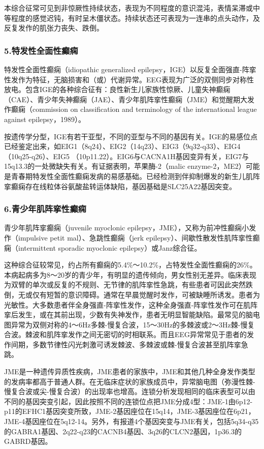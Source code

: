 本综合征常可见到非惊厥性持续状态，表现为不同程度的意识混沌，表情呆滞或中等程度的感觉迟钝，有时呈木僵状态。持续状态还可表现为一连串的点头动作，及反复发作的肌张力丧失、跌倒。

\subsubsection{5.特发性全面性癫痫}

特发性全面性癫痫（idiopathic generalized
epilepsy，IGE）以反复全面强直-阵挛性发作为特征，无脑损害和（或）代谢异常。EEG表现为广泛的双侧同步对称性放电。包含IGE的各种综合征有：良性新生儿家族性惊厥、儿童失神癫痫（CAE）、青少年失神癫痫（JAE）、青少年肌阵挛性癫痫（JME）和觉醒期大发作癫痫（commission
on classification and terminology of the international league against
epilepsy，1989）。

按遗传学分型，IGE有若干亚型，不同的亚型与不同的基因有关。IGE的易感位点已经鉴定出来，如EIG1（8q24）、EIG2（14q23）、EIG3（9q32-q33）、EIG4（10q25-q26）、EIG5
（10p11.22）。EIG6与CACNA1H基因变异有关，EIG7与15q13.3的一处微缺失有关。有证据表明，苹果酶-2（malic
enzyme-2，ME2）可能是青春期特发性全面性癫痫发病的易感基础。已经检测到伴抑制爆发的新生儿肌阵挛癫痫存在线粒体谷氨酸盐转运体缺陷，基因基础是SLC25A22基因突变。

\subsubsection{6.青少年肌阵挛性癫痫}

青少年肌阵挛癫痫（juvenile myoclonic
epilepsy，JME），又称为前冲性癫痫小发作（impulsive petit
mal）、急跳性癫痫（jerk
epilepsy）、间歇性散发性肌阵挛性癫痫（intermittent sporadic myoclonic
epilepsy）或Janz综合征。

这种综合征较常见，约占所有癫痫的5.4\%～10.2\%，占特发性全面性癫痫的26\%。本病起病多为8～20岁的青少年，有明显的遗传倾向，男女性别无差异。临床表现为双臂的单次或反复的不规则、无节律的肌阵挛性急跳，有些患者可因此突然跌倒，无或仅有短暂的意识障碍。通常在早晨觉醒时发作，可被缺睡所诱发。患者为光敏性。大多数患者伴全身强直-阵挛性发作，这种全身强直-阵挛性发作可在肌阵挛后发生，或在其前出现，少数有失神发作，患者无明显智能缺陷。最常见的脑电图异常为双侧对称的4～6Hz多棘-慢复合波，15～30Hz的多棘波或2～3Hz棘-慢复合波。棘波和肌阵挛发作之间无密切的时相联系。而且EEG异常常见于患者的发作间期，多数节律性闪光刺激可诱发棘波、多棘波或棘-慢复合波甚至肌阵挛急跳。

JME是一种遗传异质性疾病，JME患者的家族中，JME和其他几种全身发作类型的发病率都高于普通人群。在无临床症状的家族成员中，异常脑电图（弥漫性棘-慢复合波或尖-慢复合波）的出现率也增高。连锁分析发现相同的临床表型可以由不同的基因突变引起，因此按照不同的连锁位点把JME分成4型：JME-1由6p12-p11的EFHC1基因突变所致，JME-2基因座位在15q14，JME-3基因座位在6p21，JME-4基因座位在5q12-14。另外，有报道4个基因突变与JME有关，包括5q34-q35的GABRA1基因、2q22-q23的CACNB4基因、3q26的CLCN2基因，1p36.3的GABRD基因。

